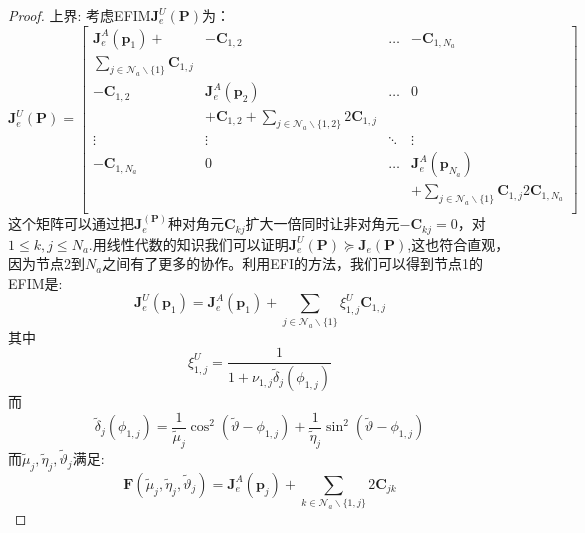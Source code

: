 \begin{proof}
上界: 考虑EFIM$\bm{J}_e^U(\bm{P})$为：
\begin{equation}
\bm{J}_e^U(\bm{P})=\left[
\begin{array}{cccc}
\bm{J}_e^A(\bm{p}_1)+&-\bm{C}_{1,2}& \dots & -\bm{C}_{1,N_a}\\
\sum_{j\in \mathcal{N}_a\backslash \{1\}}\bm{C}_{1,j}&&&\\
-\bm{C}_{1,2} &\bm{J}_e^A(\bm{p}_2)& \dots & 0\\
&+\bm{C}_{1,2}+\sum_{j\in \mathcal{N}_a\backslash \{1,2\}}2\bm{C}_{1,j} &&\\
\vdots & \vdots & \ddots & \vdots\\
-\bm{C}_{1,N_a} & 0 & \dots & \bm{J}_e^A(\bm{p}_{N_a})\\
&&&+\sum_{j\in \mathcal{N}_a\backslash \{1\}}\bm{C}_{1,j}2\bm{C}_{1,N_a}\\
\end{array}
\right]
\end{equation}
这个矩阵可以通过把$\bm{J}_e^(\bm{P})$种对角元$\bm{C}_{kj}$扩大一倍同时让非对角元$-\bm{C}_{kj}=0$，对$1\le k,j\leq N_a$.用线性代数的知识我们可以证明$\bm{J}_e^U(\bm{P}) \succeq \bm{J}_e(\bm{P})$,这也符合直观，因为节点2到$N_a$之间有了更多的协作。利用EFI的方法，我们可以得到节点1的EFIM是:
\begin{equation*}
\bm{J}_e^U(\bm{p}_1)=\bm{J}_e^A(\bm{p}_1)
+\sum_{j\in \mathcal{N}_a \backslash \{1\}}\xi_{1,j}^U\bm{C}_{1,j}
\end{equation*}
其中
\begin{equation}
\xi_{1,j}^U =\frac{1}{1+\nu_{1,j}\tilde{\delta}_j(\phi_{1,j})}
\end{equation}
而$$\tilde{\delta}_j(\phi_{1,j})=\frac{1}{\tilde{\mu}_j}\cos^2(\tilde{\vartheta}-\phi_{1,j})+\frac{1}{\tilde{\eta}_j}\sin^2(\tilde{\vartheta}-\phi_{1,j})$$
而$\tilde{\mu}_j,\tilde{\eta}_j,\tilde{\vartheta}_j$满足:
$$
\bm{F}(\tilde{\mu}_j,\tilde{\eta}_j,\tilde{\vartheta}_j)=\bm{J}^A_e(\bm{p}_j)+\sum_{k\in \mathcal{N}_a\backslash \{1,j\}} 2\bm{C}_{jk}
$$
\end{proof}
%